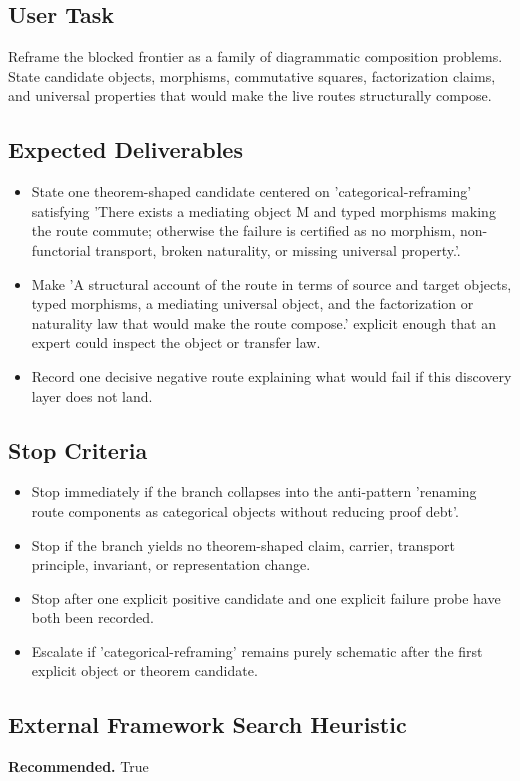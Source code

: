 \documentclass[11pt]{article}
\begin{document}
\subsection*{User Task}
Reframe the blocked frontier as a family of diagrammatic composition problems. State candidate objects, morphisms, commutative squares, factorization claims, and universal properties that would make the live routes structurally compose.

\subsection*{Expected Deliverables}
\begin{itemize}[leftmargin=*,itemsep=0.2em]
\item State one theorem-shaped candidate centered on 'categorical-reframing' satisfying 'There exists a mediating object M and typed morphisms making the route commute; otherwise the failure is certified as no morphism, non-functorial transport, broken naturality, or missing universal property.'.
\item Make 'A structural account of the route in terms of source and target objects, typed morphisms, a mediating universal object, and the factorization or naturality law that would make the route compose.' explicit enough that an expert could inspect the object or transfer law.
\item Record one decisive negative route explaining what would fail if this discovery layer does not land.
\end{itemize}
\subsection*{Stop Criteria}
\begin{itemize}[leftmargin=*,itemsep=0.2em]
\item Stop immediately if the branch collapses into the anti-pattern 'renaming route components as categorical objects without reducing proof debt'.
\item Stop if the branch yields no theorem-shaped claim, carrier, transport principle, invariant, or representation change.
\item Stop after one explicit positive candidate and one explicit failure probe have both been recorded.
\item Escalate if 'categorical-reframing' remains purely schematic after the first explicit object or theorem candidate.
\end{itemize}
\subsection*{External Framework Search Heuristic}
\textbf{Recommended.} True
\end{document}
